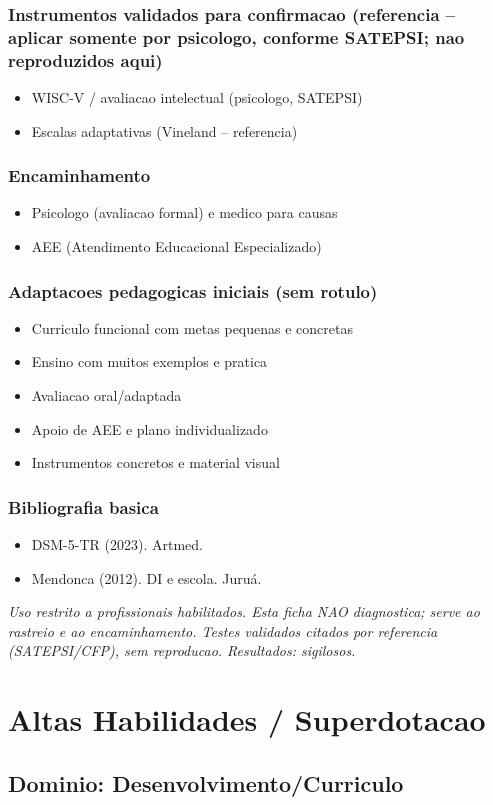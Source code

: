 \documentclass[a4paper,11pt]{book}
\newcommand{\avisolegal}{\par\medskip\noindent\footnotesize\itshape
\color{cinza}Uso restrito a profissionais habilitados. Esta ficha NAO diagnostica;
serve ao rastreio e ao encaminhamento. Testes validados citados por referencia
(SATEPSI/CFP), sem reproducao. Resultados: sigilosos.\color{black}\par}
\begin{document}
\subsection*{Instrumentos validados para confirmacao (referencia -- aplicar somente por psicologo, conforme SATEPSI; nao reproduzidos aqui)}
\begin{itemize}
\item WISC-V / avaliacao intelectual (psicologo, SATEPSI)
\item Escalas adaptativas (Vineland -- referencia)
\end{itemize}
\subsection*{Encaminhamento}
\begin{itemize}
\item Psicologo (avaliacao formal) e medico para causas
\item AEE (Atendimento Educacional Especializado)
\end{itemize}
\subsection*{Adaptacoes pedagogicas iniciais (sem rotulo)}
\begin{itemize}
\item Curriculo funcional com metas pequenas e concretas
\item Ensino com muitos exemplos e pratica
\item Avaliacao oral/adaptada
\item Apoio de AEE e plano individualizado
\item Instrumentos concretos e material visual
\end{itemize}
\subsection*{Bibliografia basica}
\begin{itemize}
\item DSM-5-TR (2023). Artmed.
\item Mendonca (2012). DI e escola. Juruá.
\end{itemize}
\avisolegal


\chapter{Altas Habilidades / Superdotacao}
\section*{Dominio: Desenvolvimento/Curriculo}
\end{document}
